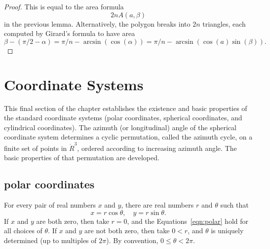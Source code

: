 \begin{proof} This is equal to the area formula
$$
2 n A(a,\beta)
$$
in the previous lemma.
Alternatively, the polygon breaks into $2n$ triangles, each computed by Girard's
formula to have area
$$
\beta - (\pi/2 - \alpha)  = \pi/n - \arcsin(\cos(\alpha)) = 
\pi/n - \arcsin(\cos(a)\sin(\beta)).
$$
\end{proof}




\section{Coordinate Systems}

This final section of the chapter establishes the existence
and basic properties of the standard coordinate systems
(polar coordinates, spherical coordinates, and cylindrical
coordinates).  The azimuth (or longitudinal) angle of the
spherical coordinate system determines a cyclic permutation,
called the azimuth cycle, on a finite set of points in $\ring{R}^3$, ordered according
to increasing azimuth angle.  The basic
properties of that permutation are developed. 

\subsection{polar coordinates}
\label{sec:polar}


For every pair of real numbers $x$ and $y$,  there are real numbers
$r$ and $\theta$ such that
    \begin{equation}\label{eqn:polar}
    x = r\cos\theta,\quad y = r\sin\theta.
    \end{equation}
If $x$ and $y$ are both zero, then take $r=0$, and the
Equations~\ref{eqn:polar} hold for all choices of $\theta$. If $x$
and $y$ are not both zero, then take $0<r$, and $\theta$ is
uniquely determined (up to multiples of $2\pi$).  By convention, 
$0\le\theta < 2\pi$.

